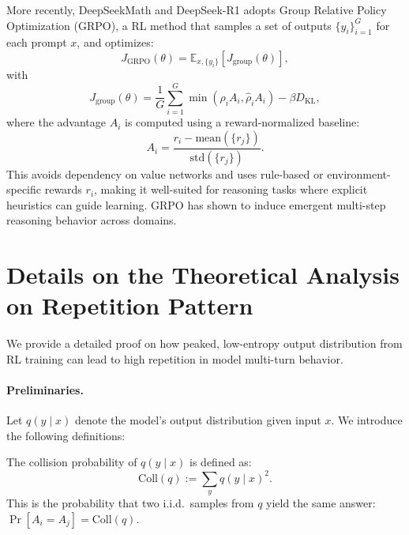 More recently, DeepSeekMath \citep{deepseekmath} and DeepSeek-R1 \citep{deepseekr1} adopts Group Relative Policy Optimization (GRPO), a RL method that samples a set of outputs \( \{y_i\}_{i=1}^G \) for each prompt \( x \), and optimizes:
\begin{equation}
    J_{\text{GRPO}}(\theta) = \mathbb{E}_{x, \{y_i\}} \left[ J_{\text{group}}(\theta) \right],
\end{equation}
with
\begin{equation}
    J_{\text{group}}(\theta) = \frac{1}{G} \sum_{i=1}^G \min\left( \rho_i A_i, \hat{\rho}_i A_i \right) - \beta D_{\mathrm{KL}},
\end{equation}
where the advantage \( A_i \) is computed using a reward-normalized baseline:
\begin{equation}
    A_i = \frac{r_i - \text{mean}(\{r_j\})}{\text{std}(\{r_j\})}.
\end{equation}
This avoids dependency on value networks and uses rule-based or environment-specific rewards \( r_i \), making it well-suited for reasoning tasks where explicit heuristics can guide learning. GRPO has shown to induce emergent multi-step reasoning behavior across domains.


\section{Details on the Theoretical Analysis on Repetition Pattern}
\label{sec:app-repetition-theory}

We provide a detailed proof on how peaked, low-entropy output distribution from RL training \citep{cui2025entropymechanismreinforcementlearning, yue2025doesreinforcementlearningreally} can lead to high repetition in model multi-turn behavior.

\paragraph{Preliminaries.} Let $q(y \mid x)$ denote the model's output distribution given input $x$. We introduce the following definitions:

\begin{definition}
The collision probability of $q(y \mid x)$ is defined as:
\begin{equation}
\mathrm{Coll}(q) := \sum_y q(y \mid x)^2.
\end{equation}
This is the probability that two i.i.d.\ samples from $q$ yield the same answer: $\Pr[A_i = A_j] = \mathrm{Coll}(q)$.
\end{definition}

